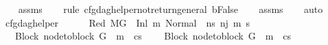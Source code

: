 \begin{isabellebody}
%
\isadelimproof
\ \ %
\endisadelimproof
%
\isatagproof
{}\isamarkupfalse%
\ assms{\isacharparenleft}{\kern0pt}{}{\isacharminus}{\kern0pt}{}{\isacharparenright}{\kern0pt}\isanewline
\ \ \isamarkupfalse%
\ {\isacharparenleft}{\kern0pt}rule\ cfg{\isacharunderscore}{\kern0pt}dag{\isacharunderscore}{\kern0pt}helper{\isacharunderscore}{\kern0pt}not{\isacharunderscore}{\kern0pt}return{\isacharunderscore}{\kern0pt}general{\isacharbrackleft}{\kern0pt}\ {\isacharquery}{\kern0pt}b{\isacharequal}{\kern0pt}False{\isacharbrackright}{\kern0pt}{\isacharparenright}{\kern0pt}\isanewline
\ \ \isamarkupfalse%
\ assms\isanewline
\ \ \isamarkupfalse%
\ auto%
\endisatagproof
{\isafoldproof}%
%
\isadelimproof
\isanewline
%
\endisadelimproof
\isanewline
{}\isamarkupfalse%
\ cfg{\isacharunderscore}{\kern0pt}dag{\isacharunderscore}{\kern0pt}helper{\isacharunderscore}{\kern0pt}{}{\isacharcolon}{\kern0pt}\isanewline
\ \ \isanewline
\ \ \ Red{\isacharcolon}{\kern0pt}\ {\isachardoublequoteopen}M{\isacharcomma}{\kern0pt}{\isasymLambda}{\isacharcomma}{\kern0pt}{\isasymGamma}{\isacharcomma}{\kern0pt}{\isasymOmega}{\isacharcomma}{\kern0pt}G{}\ {\isasymturnstile}\ {\isacharparenleft}{\kern0pt}Inl\ m{}{\isacharcomma}{\kern0pt}\ {\isacharparenleft}{\kern0pt}Normal\ \ ns{}{\isacharparenright}{\kern0pt}{\isacharparenright}{\kern0pt}\ {\isacharminus}{\kern0pt}n{\isasymrightarrow}{\isacharcircum}{\kern0pt}j\ {\isacharparenleft}{\kern0pt}m{\isacharprime}{\kern0pt}{\isacharcomma}{\kern0pt}\ s{\isacharprime}{\kern0pt}{\isacharparenright}{\kern0pt}{\isachardoublequoteclose}\ \isanewline
\ \ \ Block{\isacharcolon}{\kern0pt}\ {\isachardoublequoteopen}node{\isacharunderscore}{\kern0pt}to{\isacharunderscore}{\kern0pt}block\ G{}\ {\isacharbang}{\kern0pt}\ m{}\ {\isacharequal}{\kern0pt}\ cs{}{\isachardoublequoteclose}\ \isanewline
\ \ \ Block{}{\isacharcolon}{\kern0pt}\ {\isachardoublequoteopen}node{\isacharunderscore}{\kern0pt}to{\isacharunderscore}{\kern0pt}block\ G{}\ {\isacharbang}{\kern0pt}\ m{}\ {\isacharequal}{\kern0pt}\ cs{}{\isachardoublequoteclose}\ \ \isanewline

\end{isabellebody}
